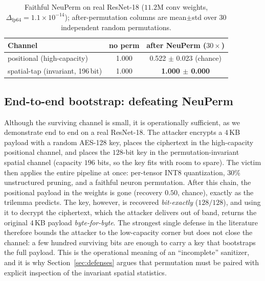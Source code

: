\documentclass[10pt,journal]{IEEEtran}
\theoremstyle{remark}
\begin{document}
\begin{table}[!tb]\centering
\caption{Faithful NeuPerm on real ResNet-18 ($11.2$M conv weights,
$\Delta_{\mathrm{fp64}}=1.1\times10^{-14}$); after-permutation columns are
mean$\pm$std over $30$ independent random permutations.}
\label{tab:neuperm}
\begin{tabular*}{\columnwidth}{@{\extracolsep{\fill}}lcc@{}}
\toprule
Channel & no perm & after NeuPerm ($30\times$)\\
\midrule
positional (high-capacity) & 1.000 & 0.522 $\pm$ 0.023 (chance)\\
spatial-tap (invariant, 196\,bit) & 1.000 & \textbf{1.000 $\pm$ 0.000}\\
\bottomrule
\end{tabular*}
\end{table}

\subsection{End-to-end bootstrap: defeating NeuPerm}\label{sec:bootstrap}
Although the surviving channel is small, it is operationally sufficient, as we
demonstrate end to end on a real ResNet-18. The
attacker encrypts a $4$\,KB payload with a random AES-128 key, places the ciphertext in
the high-capacity positional channel, and places the $128$-bit key in the
permutation-invariant spatial channel (capacity $196$ bits, so the key fits with room to
spare). The victim then applies the entire pipeline at once: per-tensor INT8
quantization, $30\%$ unstructured pruning, and a faithful neuron permutation. After this
chain, the positional payload in the weights is gone (recovery $0.50$, chance), exactly
as the trilemma predicts. The key, however, is recovered \emph{bit-exactly}
($128/128$), and using it to decrypt the ciphertext, which the attacker delivers out of
band, returns the original $4$\,KB payload \emph{byte-for-byte}. The strongest single
defense in the literature therefore bounds the attacker to the low-capacity corner but
does not close the channel: a few hundred surviving bits are enough to carry a key that
bootstraps the full payload. This is the operational meaning of an ``incomplete''
sanitizer, and it is why Section~\ref{sec:defenses} argues that permutation must be
paired with explicit inspection of the invariant spatial statistics.
\end{document}
